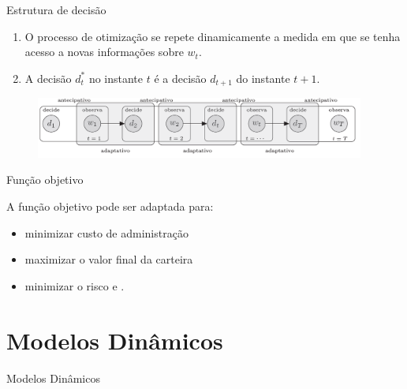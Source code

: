 \documentclass{beamer}
\begin{document}
\begin{frame}{Estrutura de decisão}

\begin{enumerate}
\item O processo de otimização se repete dinamicamente a medida em que se tenha acesso a novas informações sobre $w_t$. 
\item A decisão $d_t^{*}$ no instante $t$ é a decisão $d_{t+1}$ do instante $t+1$.
\end{enumerate}

\begin{figure}
\begin{center}
 \includegraphics[height=2cm,keepaspectratio]{processo_adapt_antecipa.png}
 \end{center}
\label{fig:atcpt}
\end{figure}

\end{frame}







\begin{frame}{Função objetivo}


A função objetivo pode ser adaptada para:

\begin{itemize}
\item minimizar custo de administração \citep{Kouwenberg2008}
\item maximizar o valor final da carteira \citep{Johannes2014}
\item minimizar o risco \citep{Ferstl2011} e \citep{Quaranta2008}.
\end{itemize}

\end{frame}







\section{Modelos Dinâmicos}


\begin{frame}{ }
    \begin{block}{ }
      \Huge  Modelos Dinâmicos
    \end{block}
\end{frame}
\end{document}
